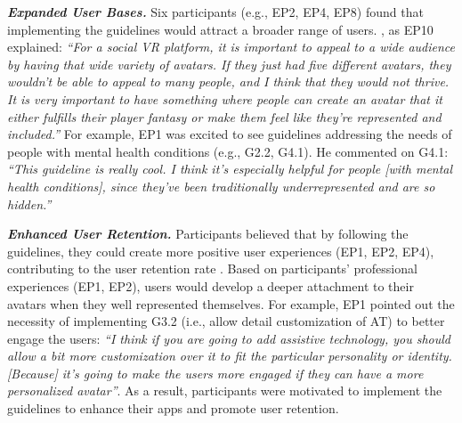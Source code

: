 \textbf{\textit{Expanded User Bases.}}
Six participants (e.g., EP2, EP4, EP8) found that implementing the guidelines would attract a broader range of users. , as EP10 explained: \textit{``For a social VR platform, it is important to appeal to a wide audience by having that wide variety of avatars. If they just had five different avatars, they wouldn't be able to appeal to many people, and I think that they would not thrive. It is very important to have something where people can create an avatar that it either fulfills their player fantasy or make them feel like they're represented and included.''}
 For example, EP1 was excited to see guidelines addressing the needs of people with mental health conditions (e.g., G2.2, G4.1). He commented on G4.1: \textit{``This guideline is really cool. I think it's especially helpful for people [with mental health conditions], since they've been traditionally underrepresented and are so hidden.''}

\textbf{\textit{Enhanced User Retention.}}
Participants believed that by following the guidelines, they could create more positive user experiences (EP1, EP2, EP4), contributing to the user retention rate \cite{ramli2022study}. Based on participants' professional experiences (EP1, EP2), users would develop a deeper attachment to their avatars when they well represented themselves. For example, EP1 pointed out the necessity of implementing G3.2 (i.e., allow detail customization of AT) to better engage the users: \textit{``I think if you are going to add assistive technology, you should allow a bit more customization over it to fit the particular personality or identity. [Because] it's going to make the users more engaged if they can have a more personalized avatar''}. %
As a result, participants were motivated to implement the guidelines to enhance their apps and promote user retention. %

